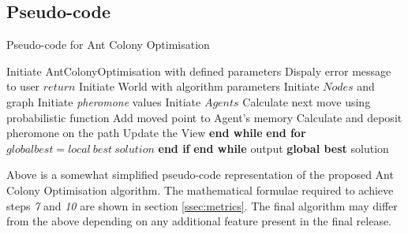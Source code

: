 \subsection{Pseudo-code}
\label{sec:pseudo}
\begin{algorithm}
\caption[Ant Colony Optimisation Pseudo-code]{Pseudo-code for Ant Colony Optimisation}
\label{aco:pseudo}
\begin{algorithmic}[1]
\State Initiate AntColonyOptimisation with defined parameters
\State Dispaly error message to user
\State $return$
\EndIf
\State Initiate World with algorithm parameters
\State Initiate $Nodes$ and graph
\State Initiate \textit{pheromone} values
\State Initiate $Agents$
\State Calculate next move using probabilistic function 
\State Add moved point to Agent's memory
\State Calculate and deposit pheromone on the path
\State Update the View
\EndWhile 
\State \textbf{end while}
\EndFor 
\State \textbf{end for}
\EndWhile
{}
\State $global best = local\ best\ solution$
\EndIf
\State \textbf{end if}
\State \textbf{end while}
\State output \textbf{global best} solution
\end{algorithmic}
\end{algorithm}

\noindent
Above is a somewhat simplified pseudo-code representation of the proposed Ant Colony Optimisation algorithm. The mathematical formulae required to achieve steps \textit{7} and \textit{10} are shown in section \ref{ssec:metrics}. The final algorithm may differ from the above depending on any additional feature present in the final release.

